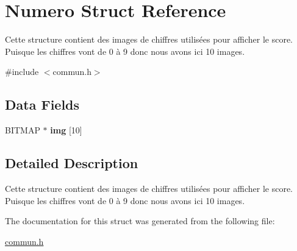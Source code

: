 \hypertarget{struct_numero}{\section{Numero Struct Reference}
\label{struct_numero}
}


Cette structure contient des images de chiffres utilisées pour afficher le score. Puisque les chiffres vont de 0 à 9 donc nous avons ici 10 images.  




{\ttfamily \#include $<$commun.\-h$>$}

\subsection*{Data Fields}
\begin{DoxyCompactItemize}
\item 
\hypertarget{struct_numero_aab65b1554dcc65b6fd50474af61ac3fb}{B\-I\-T\-M\-A\-P $\ast$ {\bfseries img} \mbox{[}10\mbox{]}}\label{struct_numero_aab65b1554dcc65b6fd50474af61ac3fb}

\end{DoxyCompactItemize}


\subsection{Detailed Description}
Cette structure contient des images de chiffres utilisées pour afficher le score. Puisque les chiffres vont de 0 à 9 donc nous avons ici 10 images. 


\begin{DoxyItemize}
\item 
\end{DoxyItemize}

The documentation for this struct was generated from the following file\-:\begin{DoxyCompactItemize}
\item 
\hyperlink{commun_8h}{commun.\-h}\end{DoxyCompactItemize}

